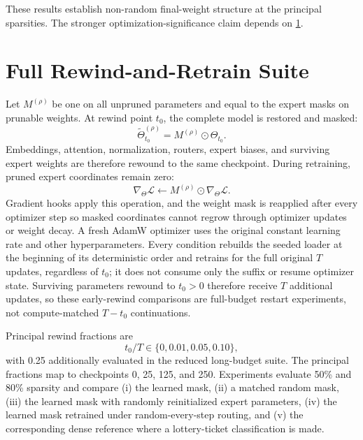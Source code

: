 \documentclass{article}
\begin{document}
These results establish non-random final-weight structure at the principal
sparsities. The stronger optimization-significance claim depends on
\cref{app:rewind}.

\section{Full Rewind-and-Retrain Suite}
\label{app:rewind}

Let $M^{(\rho)}$ be one on all unpruned parameters and equal to the expert masks
on prunable weights. At rewind point $t_0$, the complete model is restored and
masked:
\begin{equation}
\widetilde\Theta_{t_0}^{(\rho)}
=
M^{(\rho)}\odot\Theta_{t_0}.
\label{eq:app_rewind_state}
\end{equation}
Embeddings, attention, normalization, routers, expert biases, and surviving
expert weights are therefore rewound to the same checkpoint. During retraining,
pruned expert coordinates remain zero:
\begin{equation}
\nabla_\Theta\mathcal{L}
\leftarrow
M^{(\rho)}\odot\nabla_\Theta\mathcal{L}.
\label{eq:app_gradient_mask}
\end{equation}
Gradient hooks apply this operation, and the weight mask is reapplied after
every optimizer step so masked coordinates cannot regrow through optimizer
updates or weight decay.
A fresh AdamW optimizer uses the original constant learning rate and other
hyperparameters. Every condition rebuilds the seeded loader at the beginning of
its deterministic order and retrains for the full original $T$ updates,
regardless of $t_0$; it does not consume only the suffix or resume optimizer
state. Surviving parameters rewound to $t_0>0$ therefore receive $T$ additional
updates, so these early-rewind comparisons are full-budget restart experiments,
not compute-matched $T-t_0$ continuations.

Principal rewind fractions are
\begin{equation}
t_0/T\in\{0,0.01,0.05,0.10\},
\label{eq:app_rewind_points}
\end{equation}
with 0.25 additionally evaluated in the reduced long-budget suite. The principal
fractions map to checkpoints 0, 25, 125, and 250. Experiments evaluate
50\% and 80\% sparsity and compare (i) the learned mask, (ii) a matched random
mask, (iii) the learned mask with randomly reinitialized expert parameters,
(iv) the learned mask retrained under random-every-step routing, and (v) the
corresponding dense reference where a lottery-ticket classification is made.
\end{document}
